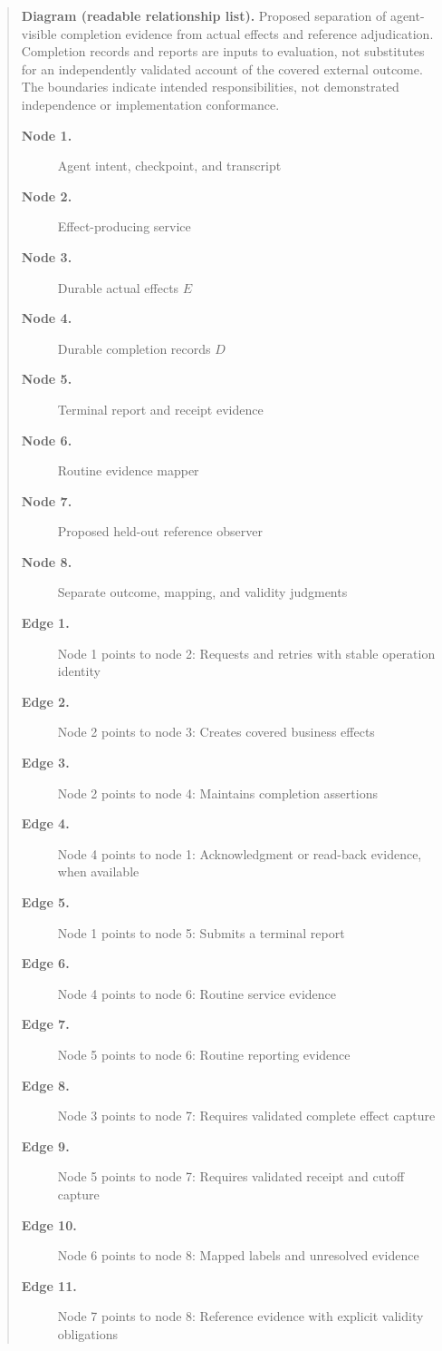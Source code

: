 \documentclass[11pt]{article}
\begin{document}
\begin{quote}
\textbf{Diagram (readable relationship list).} Proposed separation of agent-visible completion evidence from actual effects and reference adjudication. Completion records and reports are inputs to evaluation, not substitutes for an independently validated account of the covered external outcome. The boundaries indicate intended responsibilities, not demonstrated independence or implementation conformance.
\begin{description}
\item[\textbf{Node 1.}] Agent intent, checkpoint, and transcript
\item[\textbf{Node 2.}] Effect-producing service
\item[\textbf{Node 3.}] Durable actual effects $E$
\item[\textbf{Node 4.}] Durable completion records $D$
\item[\textbf{Node 5.}] Terminal report and receipt evidence
\item[\textbf{Node 6.}] Routine evidence mapper
\item[\textbf{Node 7.}] Proposed held-out reference observer
\item[\textbf{Node 8.}] Separate outcome, mapping, and validity judgments
\item[\textbf{Edge 1.}] Node 1 points to node 2: Requests and retries with stable operation identity
\item[\textbf{Edge 2.}] Node 2 points to node 3: Creates covered business effects
\item[\textbf{Edge 3.}] Node 2 points to node 4: Maintains completion assertions
\item[\textbf{Edge 4.}] Node 4 points to node 1: Acknowledgment or read-back evidence, when available
\item[\textbf{Edge 5.}] Node 1 points to node 5: Submits a terminal report
\item[\textbf{Edge 6.}] Node 4 points to node 6: Routine service evidence
\item[\textbf{Edge 7.}] Node 5 points to node 6: Routine reporting evidence
\item[\textbf{Edge 8.}] Node 3 points to node 7: Requires validated complete effect capture
\item[\textbf{Edge 9.}] Node 5 points to node 7: Requires validated receipt and cutoff capture
\item[\textbf{Edge 10.}] Node 6 points to node 8: Mapped labels and unresolved evidence
\item[\textbf{Edge 11.}] Node 7 points to node 8: Reference evidence with explicit validity obligations

\end{description}
\end{quote}
\end{document}
